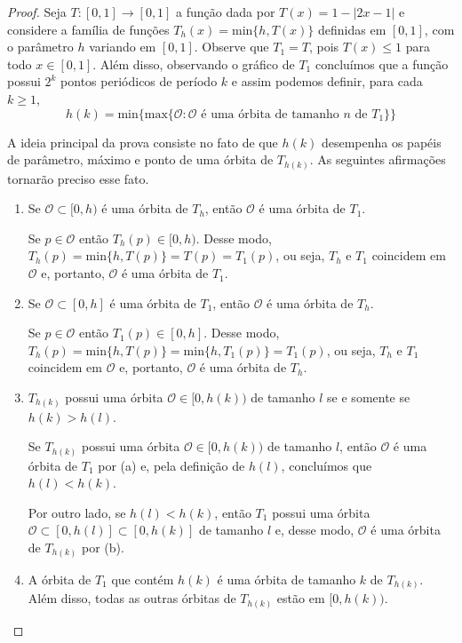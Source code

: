 \begin{proof}
Seja $T: [0,1] \to [0,1]$ a função dada por $T(x) = 1 - |2x - 1|$ e considere a família de funções $T_h(x) = \textrm{min}\{h, T(x)\}$ definidas em $[0,1]$, com o parâmetro $h$ variando em $[0,1]$. Observe que $T_1 = T$, pois $T(x) \leq 1$ para todo $x \in [0,1]$. Além disso, observando o gráfico de $T_1$ concluímos que a função possui $2^k$ pontos periódicos de período $k$ e assim podemos definir, para cada $k \geq 1$, $$h(k) = \textrm{min} \{ \textrm{max} \{ \mathcal{O} : \mathcal{O} \textrm{ é uma órbita de tamanho } n \textrm{ de } T_1\} \}$$

A ideia principal da prova consiste no fato de que $h(k)$ desempenha os papéis de parâmetro, máximo e ponto de uma órbita de $T_{h(k)}$. As seguintes afirmações tornarão preciso esse fato.

\begin{enumerate}[label = (\alph*)]
\item Se $\mathcal{O} \subset [0, h)$ é uma órbita de $T_h$, então $\mathcal{O}$ é uma órbita de $T_1$.

Se $p \in \mathcal{O}$ então $T_h(p) \in [0, h)$. Desse modo, $T_h(p) = \textrm{min}\{h, T(p)\} = T(p) = T_1(p)$, ou seja, $T_h$ e $T_1$ coincidem em $\mathcal{O}$ e, portanto, $\mathcal{O}$ é uma órbita de $T_1$.

\item Se $\mathcal{O} \subset [0, h]$ é uma órbita de $T_1$, então $\mathcal{O}$ é uma órbita de $T_h$.

Se $p \in \mathcal{O}$ então $T_1(p) \in [0, h]$. Desse modo, $T_h(p) = \textrm{min}\{h, T(p)\} = \textrm{min}\{h, T_1(p)\} = T_1(p)$, ou seja, $T_h$ e $T_1$ coincidem em $\mathcal{O}$ e, portanto, $\mathcal{O}$ é uma órbita de $T_h$.

\item $T_{h(k)}$ possui uma órbita $\mathcal{O} \in [0, h(k))$ de tamanho $l$ se e somente se $h(k) > h(l)$.

Se $T_{h(k)}$ possui uma órbita $\mathcal{O} \in [0, h(k))$ de tamanho $l$, então $\mathcal{O}$ é uma órbita de $T_1$ por (a) e, pela definição de $h(l)$, concluímos que $h(l) < h(k)$.

Por outro lado, se $h(l) < h(k)$, então $T_1$ possui uma órbita $\mathcal{O} \subset [0, h(l)] \subset [0, h(k)]$ de tamanho $l$ e, desse modo, $\mathcal{O}$ é uma órbita de $T_{h(k)}$ por (b).

\item A órbita de $T_1$ que contém $h(k)$ é uma órbita de tamanho $k$ de $T_{h(k)}$. Além disso, todas as outras órbitas de $T_{h(k)}$ estão em $[0, h(k))$. 


\end{enumerate}
\end{proof}

